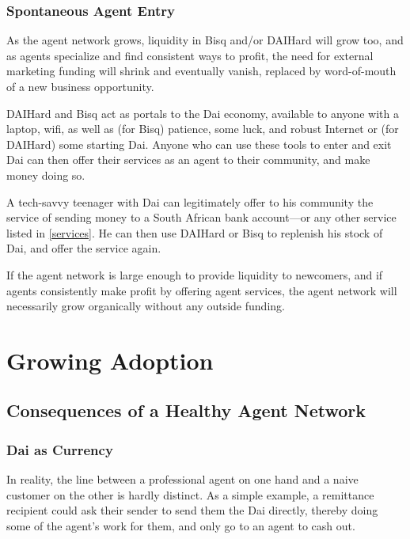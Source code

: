 \documentclass{article}
\begin{document}
\subsubsection{Spontaneous Agent Entry} \label{spontaneous}

As the agent network grows, liquidity in Bisq and/or DAIHard will grow too, and as agents specialize and find consistent ways to profit, the need for external marketing funding will shrink and eventually vanish, replaced by word-of-mouth of a new business opportunity.

DAIHard and Bisq act as portals to the Dai economy, available to anyone with a laptop, wifi, as well as (for Bisq) patience, some luck, and robust Internet or (for DAIHard) some starting Dai. Anyone who can use these tools to enter and exit Dai can then offer their services as an agent to their community, and make money doing so.

A tech-savvy teenager with Dai can legitimately offer to his community the service of sending money to a South African bank account---or any other service listed in \ref{services}. He can then use DAIHard or Bisq to replenish his stock of Dai, and offer the service again.

If the agent network is large enough to provide liquidity to newcomers, and if agents consistently make profit by offering agent services, the agent network will necessarily grow organically without any outside funding.

\newpage
\section{Growing Adoption} \label{growing adoption}

\subsection{Consequences of a Healthy Agent Network} \label{consequences}

\subsubsection{Dai as Currency} \label{currency}

In reality, the line between a professional agent on one hand and a naive customer on the other is hardly distinct. As a simple example, a remittance recipient could ask their sender to send them the Dai directly, thereby doing some of the agent's work for them, and only go to an agent to cash out.
\end{document}
